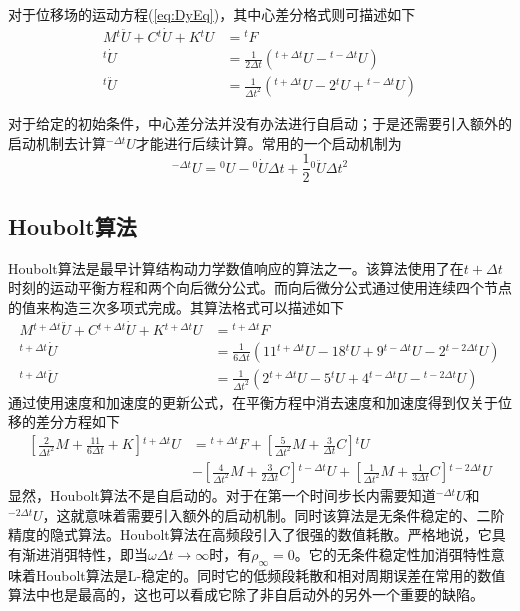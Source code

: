 对于位移场的运动方程(\ref{eq:DyEq})，其中心差分格式则可描述如下
\begin{align}
M{^{t}\!\ddot{U}}+C{^{t}\!\dot{U}}+K{^{t}\!U}&={^{t}\!F}\\
{^t\!\dot{U}}&=\frac{1}{2\Delta t}({^{t+\Delta t}\!{U}}-{^{t-\Delta t}\!{U}})\\
{^t\!\ddot{U}}&=\frac{1}{\Delta t^2}({^{t+\Delta t}\!{U}}-2{^t\!{U}}+{^{t-\Delta t}\!{U}})
\end{align}

对于给定的初始条件，中心差分法并没有办法进行自启动；于是还需要引入额外的启动机制去计算${^{-\Delta t}\!U}$才能进行后续计算。常用的一个启动机制\cite{张雄2007}为
\begin{equation}
{^{-\Delta t}\!U}={^0\!U}-{^0\!\dot{U}}\Delta t+\frac{1}{2}{^0\!\ddot{U}}\Delta t^2
\end{equation}
\subsection{Houbolt算法}
Houbolt算法\cite{Geradin2006}是最早计算结构动力学数值响应的算法之一。该算法使用了在$t+\Delta t$时刻的运动平衡方程和两个向后微分公式。而向后微分公式通过使用连续四个节点的值来构造三次多项式完成。其算法格式可以描述如下
\begin{subequations}
\begin{align}
M{^{t+\Delta t}\!\ddot{U}}+C{^{t+\Delta t}\!\dot{U}}+K{^{t+\Delta t}\!U}&={^{t+\Delta t}\!F}\\
{^{t+\Delta t}\!\dot{U}}&=\frac{1}{6\Delta t}(11{^{t+\Delta t}\!U}-18{^{t}\!U}+9{^{t-\Delta t}\!U}-2{^{t-2\Delta t}\!U})\\
{^{t+\Delta t}\!\ddot{U}}&=\frac{1}{\Delta t^2}(2{^{t+\Delta t}\!U}-5{^{t}\!U}+4{^{t-\Delta t}\!U}-{^{t-2\Delta t}\!U})
\end{align}
\end{subequations}
通过使用速度和加速度的更新公式，在平衡方程中消去速度和加速度得到仅关于位移的差分方程如下
\begin{equation}
\begin{split}
\left[\frac{2}{\Delta t^2}M+\frac{11}{6\Delta t}+K\right]{^{t+\Delta t}\!U}&={^{t+\Delta t}\!F}+\left[\frac{5}{\Delta t^2}M+\frac{3}{\Delta t}C\right]{^t\!U}\\
&-\left[\frac{4}{\Delta t^2}M+\frac{3}{2\Delta t}C\right]{^{t-\Delta t}\!U}+\left[\frac{1}{\Delta t^2}M+\frac{1}{3\Delta t}C\right]{^{t-2\Delta t}\!U}
\end{split}
\end{equation}
显然，Houbolt算法不是自启动的。对于在第一个时间步长内需要知道${^{-\Delta t}\!U}$和${^{-2\Delta t}\!U}$，这就意味着需要引入额外的启动机制。同时该算法是无条件稳定的、二阶精度的隐式算法。Houbolt算法在高频段引入了很强的数值耗散。严格地说，它具有渐进消弭特性，即当$\omega\Delta t\to \infty$时，有$\rho_{\infty}=0$。它的无条件稳定性加消弭特性意味着Houbolt算法是L-稳定的。同时它的低频段耗散和相对周期误差在常用的数值算法中也是最高的，这也可以看成它除了非自启动外的另外一个重要的缺陷。

